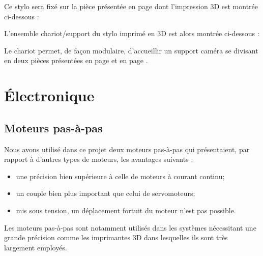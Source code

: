 \documentclass[12pt,a4paper]{report}
\begin{document}
	
	Ce stylo sera fixé sur la pièce présentée en page \pageref{supportstylo} dont l'impression 3D est montrée ci-dessous :
	
	
L'ensemble chariot/support du stylo imprimé en 3D est alors montrée ci-dessous :


Le chariot permet, de façon modulaire, d'accueillir un support caméra se divisant en deux pièces présentées en page \pageref{chariotcamera} et en page \pageref{supportcamera}.
	

	\chapter{Électronique}
\section{Moteurs pas-à-pas}
\label{Elec_stepper}
Nous avons utilisé dans ce projet deux moteurs pas-à-pas qui présentaient, par rapport à d'autres types de moteurs, les avantages suivants : 
\begin{itemize}[label=--,itemsep=0pt,font=\bf\Large,labelsep=5mm]
\item une précision bien supérieure à celle de moteurs à courant continu;
\item un couple bien plus important que celui de servomoteurs;
\item mis sous tension, un déplacement fortuit du moteur n'est pas possible.
\end{itemize}
Les moteurs pas-à-pas sont notamment utilisés dans les systèmes nécessitant une grande précision comme les imprimantes 3D dans lesquelles ils sont très largement employés.
\end{document}
